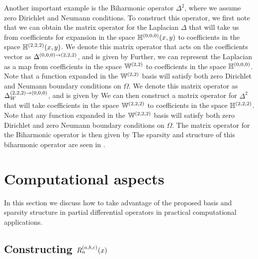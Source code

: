 Another important example is the Biharmonic operator $\Delta^2$, where we assume zero Dirichlet and Neumann conditions. To construct this operator, we first note that we can obtain the matrix operator for the Laplacian $\Delta$ that will take us from coefficients for expansion in the space ${\mathbb{H}^{(0,0,0)}}(x,y)$ to coefficients in the space $\mathbb{H}^{(2,2,2)}(x,y)$. We denote this matrix operator that acts on the coefficients vector as $\Delta^{(0,0,0)\to(2,2,2)}$, and is given by
Further, we can represent the Laplacian as a map from coefficients in the space $\mathbb{W}^{(2,2)}$ to coefficients in the space ${\mathbb{H}^{(0,0,0)}}$. Note that a function expanded in the $\mathbb{W}^{(2,2)}$ basis will satisfy both zero Dirichlet and Neumann boundary conditions on $\Omega$. We denote this matrix operator as $\Delta_W^{(2,2,2)\to(0,0,0)}$, and is given by
We can then construct a matrix operator for $\Delta^2$ that will take coefficients in the space $\mathbb{W}^{(2,2,2)}$ to coefficients in the space $\mathbb{H}^{(2,2,2)}$. Note that any function expanded in the $\mathbb{W}^{(2,2,2)}$ basis will satisfy both zero Dirichlet and zero Neumann boundary conditions on $\Omega$. The matrix operator for the Biharmonic operator is then given by
The sparsity and structure of this biharmonic operator are seen in .



\section{Computational aspects}\label{Section:Computation}

In this section we discuss how to take advantage of the proposed basis and sparsity structure in partial differential operators in practical computational applications.

\subsection{Constructing $R_n^{(a,b,c)}(x)$}



